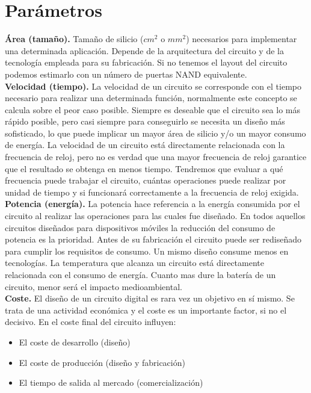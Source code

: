\section{Parámetros}
\textbf{Área (tamaño).} Tamaño de silicio ($cm^{2}$ o $mm^{2}$) necesarios para implementar una determinada aplicación. Depende de la arquitectura del circuito y de la tecnología empleada para su fabricación. Si no tenemos el layout del circuito podemos estimarlo con un número de puertas NAND equivalente.\\
\textbf{Velocidad (tiempo).} La velocidad de un circuito se corresponde con el tiempo necesario para realizar una determinada función, normalmente este concepto se calcula sobre el peor caso posible. Siempre es deseable que el circuito sea lo más rápido posible, pero casi siempre para conseguirlo se necesita un diseño más sofisticado, lo que puede implicar un mayor área de silicio y/o un mayor consumo de energía. La velocidad de un circuito está directamente relacionada con la frecuencia de reloj, pero no es verdad que una mayor frecuencia de reloj garantice que el resultado se obtenga en menos tiempo. Tendremos que evaluar a qué frecuencia puede trabajar el circuito, cuántas operaciones puede realizar por unidad de tiempo y si funcionará correctamente a la frecuencia de reloj exigida.\\
\textbf{Potencia (energía).} La potencia hace referencia a la energía consumida por el circuito al realizar las operaciones para las cuales fue diseñado. En todos aquellos circuitos diseñados para dispositivos móviles la reducción del consumo de potencia es la prioridad. Antes de su fabricación el circuito puede ser rediseñado para cumplir los requisitos de consumo. Un mismo diseño consume menos en tecnologías. La temperatura que alcanza un circuito está directamente relacionada con el consumo de energía. Cuanto mas dure la batería de un circuito, menor será el impacto medioambiental. \\
\textbf{Coste.} El diseño de un circuito digital es rara vez un objetivo en sí mismo. Se trata de una actividad económica y el coste es un importante factor, si no el decisivo.
En el coste final del circuito influyen:
\begin{itemize}
    \item El coste de desarrollo (diseño)
    \item El coste de producción (diseño y fabricación)
    \item El tiempo de salida al mercado (comercialización)
\end{itemize}


